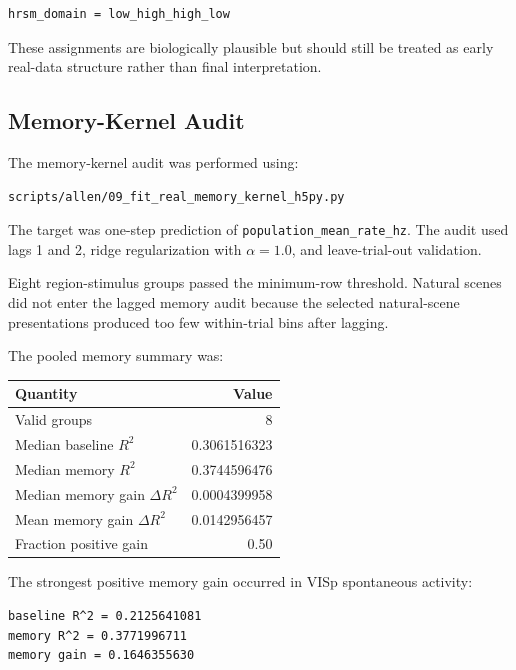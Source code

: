 \begin{verbatim}
hrsm_domain = low_high_high_low
\end{verbatim}

These assignments are biologically plausible but should still be treated as early real-data structure rather than final interpretation.

\subsection{Memory-Kernel Audit}

The memory-kernel audit was performed using:

\begin{verbatim}
scripts/allen/09_fit_real_memory_kernel_h5py.py
\end{verbatim}

The target was one-step prediction of \texttt{population\_mean\_rate\_hz}. The audit used lags 1 and 2, ridge regularization with \(\alpha = 1.0\), and leave-trial-out validation.

Eight region-stimulus groups passed the minimum-row threshold. Natural scenes did not enter the lagged memory audit because the selected natural-scene presentations produced too few within-trial bins after lagging.

The pooled memory summary was:

\begin{center}
\begin{tabular}{lr}
\hline
Quantity & Value \\
\hline
Valid groups & 8 \\
Median baseline \(R^2\) & 0.3061516323 \\
Median memory \(R^2\) & 0.3744596476 \\
Median memory gain \(\Delta R^2\) & 0.0004399958 \\
Mean memory gain \(\Delta R^2\) & 0.0142956457 \\
Fraction positive gain & 0.50 \\
\hline
\end{tabular}
\end{center}

The strongest positive memory gain occurred in VISp spontaneous activity:

\begin{verbatim}
baseline R^2 = 0.2125641081
memory R^2 = 0.3771996711
memory gain = 0.1646355630
\end{verbatim}

